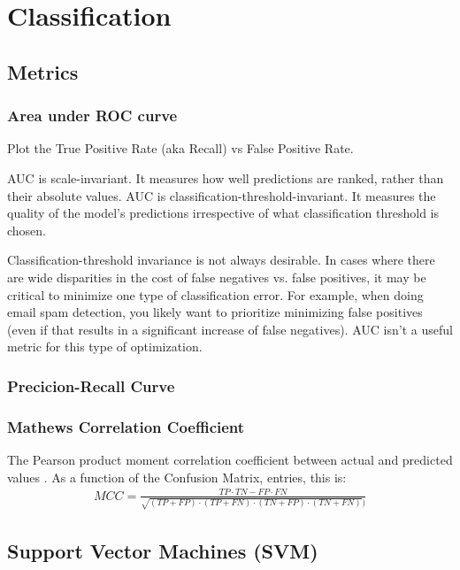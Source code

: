 \documentclass[12pt]{article}
\begin{document}
\section{Classification}
\newrefsection

\subsection{Metrics}

\subsubsection{Area under ROC curve}

Plot the True Positive Rate (aka Recall) vs False Positive Rate.

AUC is scale-invariant. It measures how well predictions are ranked, rather than
their absolute values. AUC is classification-threshold-invariant. It measures the quality of the model's predictions irrespective of what classification threshold is chosen.

Classification-threshold invariance is not always desirable. In cases where
there are wide disparities in the cost of false negatives vs. false positives,
it may be critical to minimize one type of classification error. For example,
when doing email spam detection, you likely want to prioritize minimizing false
positives (even if that results in a significant increase of false negatives).
AUC isn't a useful metric for this type of optimization.

\subsubsection{Precicion-Recall Curve}



\subsubsection{Mathews Correlation Coefficient}

The Pearson product moment correlation coefficient between actual and predicted
values \cite[Methods]{ChiccoJurman2020}. As a function of the Confusion Matrix, entries, this is:
\begin{align*}
  MCC = \frac{TP \cdot TN - FP \cdot FN}{\sqrt{(TP+FP)\cdot(TP + FN) \cdot (TN+FP) \cdot (TN+FN)})}
\end{align*}



\subsection{Support Vector Machines (SVM)} %
\end{document}
